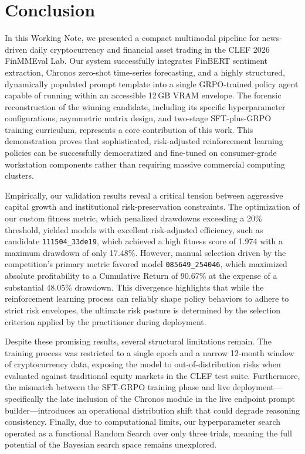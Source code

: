     \section{Conclusion}
    In this Working Note, we presented a compact multimodal pipeline for news-driven daily cryptocurrency and financial asset trading in the CLEF 2026 FinMMEval Lab. Our system successfully integrates FinBERT sentiment extraction, Chronos zero-shot time-series forecasting, and a highly structured, dynamically populated prompt template into a single GRPO-trained policy agent capable of running within an accessible 12\,GB VRAM envelope. The forensic reconstruction of the winning candidate, including its specific hyperparameter configurations, asymmetric matrix design, and two-stage SFT-plus-GRPO training curriculum, represents a core contribution of this work. This demonstration proves that sophisticated, risk-adjusted reinforcement learning policies can be successfully democratized and fine-tuned on consumer-grade workstation components rather than requiring massive commercial computing clusters.

    Empirically, our validation results reveal a critical tension between aggressive capital growth and institutional risk-preservation constraints. The optimization of our custom fitness metric, which penalized drawdowns exceeding a 20\% threshold, yielded models with excellent risk-adjusted efficiency, such as candidate \texttt{111504\_33de19}, which achieved a high fitness score of 1.974 with a maximum drawdown of only 17.48\%. However, manual selection driven by the competition's primary metric favored model \texttt{085649\_254046}, which maximized absolute profitability to a Cumulative Return of 90.67\% at the expense of a substantial 48.05\% drawdown. This divergence highlights that while the reinforcement learning process can reliably shape policy behaviors to adhere to strict risk envelopes, the ultimate risk posture is determined by the selection criterion applied by the practitioner during deployment.

    Despite these promising results, several structural limitations remain. The training process was restricted to a single epoch and a narrow 12-month window of cryptocurrency data, exposing the model to out-of-distribution risks when evaluated against traditional equity markets in the CLEF test suite. Furthermore, the mismatch between the SFT-GRPO training phase and live deployment—specifically the late inclusion of the Chronos module in the live endpoint prompt builder—introduces an operational distribution shift that could degrade reasoning consistency. Finally, due to computational limits, our hyperparameter search operated as a functional Random Search over only three trials, meaning the full potential of the Bayesian search space remains unexplored.


